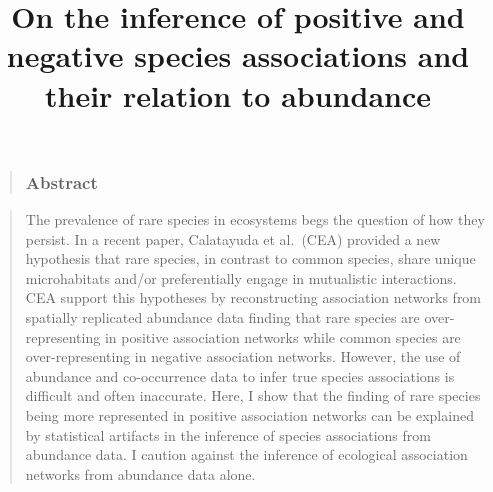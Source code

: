 \documentclass[
]{article}
\title{On the inference of positive and negative species associations
and their relation to abundance}
\author{}
\date{\vspace{-2.5em}}
\begin{document}
\maketitle

\linenumbers

\begin{quote}
\hypertarget{abstract}{%
\subsubsection{Abstract}\label{abstract}}
\end{quote}

\begin{quote}
The prevalence of rare species in ecosystems begs the question of how
they persist. In a recent paper, Calatayuda et al.~(CEA) provided a new
hypothesis that rare species, in contrast to common species, share
unique microhabitats and/or preferentially engage in mutualistic
interactions. CEA support this hypotheses by reconstructing association
networks from spatially replicated abundance data finding that rare
species are over-representing in positive association networks while
common species are over-representing in negative association networks.
However, the use of abundance and co-occurrence data to infer true
species associations is difficult and often inaccurate. Here, I show
that the finding of rare species being more represented in positive
association networks can be explained by statistical artifacts in the
inference of species associations from abundance data. I caution against
the inference of ecological association networks from abundance data
alone. \newline \newline
\end{quote}
\end{document}
